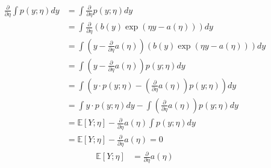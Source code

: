 \begin{answer}
\begin{align*}
\frac{\partial}{\partial \eta} \int p(y;\eta) dy&= \int \frac{\partial}{\partial \eta} p(y;\eta) dy\\
&=\int \frac{\partial}{\partial \eta} \left(b(y)\exp(\eta y - a(\eta))\right) dy\\
&=\int\left(y-\frac{\partial}{\partial \eta}a(\eta)\right)\left(b(y)\exp(\eta y - a(\eta))\right) dy\\
&=\int\left(y-\frac{\partial}{\partial \eta}a(\eta)\right)p(y;\eta)dy\\
&=\int\left(y\cdot p(y;\eta)-\left(\frac{\partial}{\partial \eta}a(\eta)\right)p(y;\eta)\right)dy\\
&=\int y\cdot p(y;\eta)dy-\int\left(\frac{\partial}{\partial \eta}a(\eta)\right)p(y;\eta) dy\\
&=\mathbb{E}[Y; \eta]-\frac{\partial}{\partial \eta}a(\eta) \int p(y;\eta) dy\\
&=\mathbb{E}[Y; \eta]-\frac{\partial}{\partial \eta}a(\eta)=0
\end{align*}
\begin{align*}
\mathbb{E}[Y; \eta]&=\frac{\partial}{\partial \eta}a(\eta)
\end{align*}
\end{answer}
